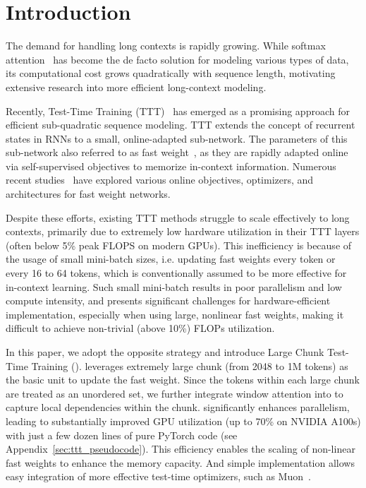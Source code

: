 \documentclass{article}
\begin{document}
\section{Introduction} \label{sec:Introduction}

The demand for handling long contexts is rapidly growing. While softmax attention~\cite{vaswani2017attention} has become the de facto solution for modeling various types of data, its computational cost grows quadratically with sequence length, motivating extensive research into more 
efficient long-context modeling.

Recently, Test-Time Training (TTT)~\cite{sun2024learning} has emerged as a promising approach for efficient sub-quadratic sequence modeling. TTT extends the concept of recurrent states in RNNs to a small, online-adapted sub-network.
The parameters of this sub-network also referred to as fast weight~\cite{schlag2021linear}, as they are rapidly adapted online via self-supervised objectives to memorize in-context information. 
Numerous recent studies~\cite{wang2025testtimeregressionunifyingframework,behrouz2024titans,behrouz2025itsconnectedjourneytesttime, karami2025lattice} have explored various online objectives, optimizers, and architectures for fast weight networks.

Despite these efforts, existing TTT methods struggle to scale effectively to long contexts, primarily due to extremely low hardware utilization in their TTT layers (often below 5\% peak FLOPS on modern GPUs). 
This inefficiency is because of the usage of
small mini-batch sizes, i.e. updating fast weights every token or every 16 to 64 tokens, which is conventionally assumed to be more effective for in-context learning.
Such small mini-batch results in poor parallelism and low compute intensity, and presents significant challenges for hardware-efficient 
implementation, especially when using large, nonlinear fast weights, making it difficult to achieve non-trivial (above 10\%) FLOPs utilization. 

In this paper, we adopt the opposite strategy and introduce Large Chunk Test-Time Training (\methodname). 
\methodname{} leverages extremely large chunk (from 2048 to 1M tokens) as the basic unit to update the fast weight.
Since the tokens within each large chunk are treated as an unordered set, we further integrate window attention
into \methodname{} to capture local dependencies within the chunk.
\methodname{} significantly enhances parallelism, leading to substantially improved GPU utilization (up to 70\% on NVIDIA A100s)  with just a few dozen lines of pure PyTorch code (see Appendix~\ref{sec:ttt_pseudocode}).
This efficiency enables the scaling of non-linear fast weights to enhance the memory capacity. And simple implementation allows easy integration of more effective test-time optimizers, such as Muon~\cite{jordan2024muon}.
\end{document}
